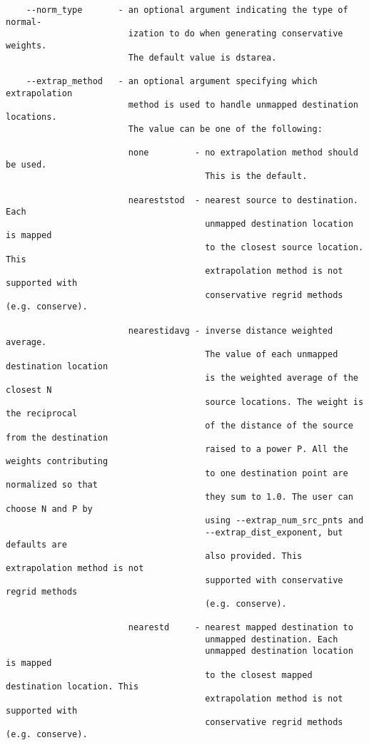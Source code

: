 \begin{verbatim}
    --norm_type       - an optional argument indicating the type of normal-
                        ization to do when generating conservative weights. 
                        The default value is dstarea.

    --extrap_method   - an optional argument specifying which extrapolation
                        method is used to handle unmapped destination locations.
                        The value can be one of the following:

                        none         - no extrapolation method should be used.
                                       This is the default. 

                        neareststod  - nearest source to destination. Each
                                       unmapped destination location is mapped 
                                       to the closest source location. This 
                                       extrapolation method is not supported with 
                                       conservative regrid methods (e.g. conserve).
        
                        nearestidavg - inverse distance weighted average. 
                                       The value of each unmapped destination location
                                       is the weighted average of the closest N 
                                       source locations. The weight is the reciprocal 
                                       of the distance of the source from the destination
                                       raised to a power P. All the weights contributing 
                                       to one destination point are normalized so that 
                                       they sum to 1.0. The user can choose N and P by
                                       using --extrap_num_src_pnts and 
                                       --extrap_dist_exponent, but defaults are 
                                       also provided. This extrapolation method is not 
                                       supported with conservative regrid methods
                                       (e.g. conserve).

                        nearestd     - nearest mapped destination to 
                                       unmapped destination. Each
                                       unmapped destination location is mapped 
                                       to the closest mapped destination location. This 
                                       extrapolation method is not supported with 
                                       conservative regrid methods (e.g. conserve).


\end{verbatim}
